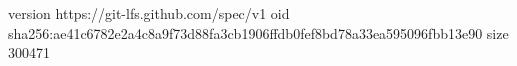 version https://git-lfs.github.com/spec/v1
oid sha256:ae41c6782e2a4c8a9f73d88fa3cb1906ffdb0fef8bd78a33ea595096fbb13e90
size 300471

